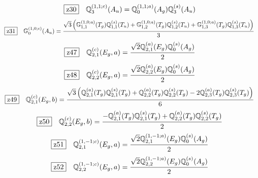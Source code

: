 \documentclass[fleqn,10pt,landscape]{jsarticle}
\begin{document}
\begin{dmath*}
\hspace*{3mm}\fbox{z30}\quad \mathbb{Q}_{3}^{(1,1;c)}(A_{u})=\mathbb{Q}_{0}^{(1,1;a)}(A_{g}) \mathbb{Q}_{3}^{(s)}(A_{u})
\end{dmath*}
\begin{dmath*}
\hspace*{3mm}\fbox{z31}\quad \mathbb{G}_{0}^{(1,0;c)}(A_{u})=\frac{\sqrt{3} \left(\mathbb{G}_{1,1}^{(1,0;a)}(T_{g}) \mathbb{Q}_{1,1}^{(s)}(T_{u}) + \mathbb{G}_{1,2}^{(1,0;a)}(T_{g}) \mathbb{Q}_{1,2}^{(s)}(T_{u}) + \mathbb{G}_{1,3}^{(1,0;a)}(T_{g}) \mathbb{Q}_{1,3}^{(s)}(T_{u})\right)}{3}
\end{dmath*}
\begin{dmath*}
\hspace*{3mm}\fbox{z47}\quad \mathbb{Q}_{2,1}^{(c)}(E_{g},a)=\frac{\sqrt{2} \mathbb{Q}_{2,1}^{(a)}(E_{g}) \mathbb{Q}_{0}^{(s)}(A_{g})}{2}
\end{dmath*}
\begin{dmath*}
\hspace*{3mm}\fbox{z48}\quad \mathbb{Q}_{2,2}^{(c)}(E_{g},a)=\frac{\sqrt{2} \mathbb{Q}_{2,2}^{(a)}(E_{g}) \mathbb{Q}_{0}^{(s)}(A_{g})}{2}
\end{dmath*}
\begin{dmath*}
\hspace*{3mm}\fbox{z49}\quad \mathbb{Q}_{2,1}^{(c)}(E_{g},b)=\frac{\sqrt{3} \left(\mathbb{Q}_{2,1}^{(a)}(T_{g}) \mathbb{Q}_{2,1}^{(s)}(T_{g}) + \mathbb{Q}_{2,2}^{(a)}(T_{g}) \mathbb{Q}_{2,2}^{(s)}(T_{g}) - 2 \mathbb{Q}_{2,3}^{(a)}(T_{g}) \mathbb{Q}_{2,3}^{(s)}(T_{g})\right)}{6}
\end{dmath*}
\begin{dmath*}
\hspace*{3mm}\fbox{z50}\quad \mathbb{Q}_{2,2}^{(c)}(E_{g},b)=\frac{- \mathbb{Q}_{2,1}^{(a)}(T_{g}) \mathbb{Q}_{2,1}^{(s)}(T_{g}) + \mathbb{Q}_{2,2}^{(a)}(T_{g}) \mathbb{Q}_{2,2}^{(s)}(T_{g})}{2}
\end{dmath*}
\begin{dmath*}
\hspace*{3mm}\fbox{z51}\quad \mathbb{Q}_{2,1}^{(1,-1;c)}(E_{g},a)=\frac{\sqrt{2} \mathbb{Q}_{2,1}^{(1,-1;a)}(E_{g}) \mathbb{Q}_{0}^{(s)}(A_{g})}{2}
\end{dmath*}
\begin{dmath*}
\hspace*{3mm}\fbox{z52}\quad \mathbb{Q}_{2,2}^{(1,-1;c)}(E_{g},a)=\frac{\sqrt{2} \mathbb{Q}_{2,2}^{(1,-1;a)}(E_{g}) \mathbb{Q}_{0}^{(s)}(A_{g})}{2}
\end{dmath*}
\end{document}
